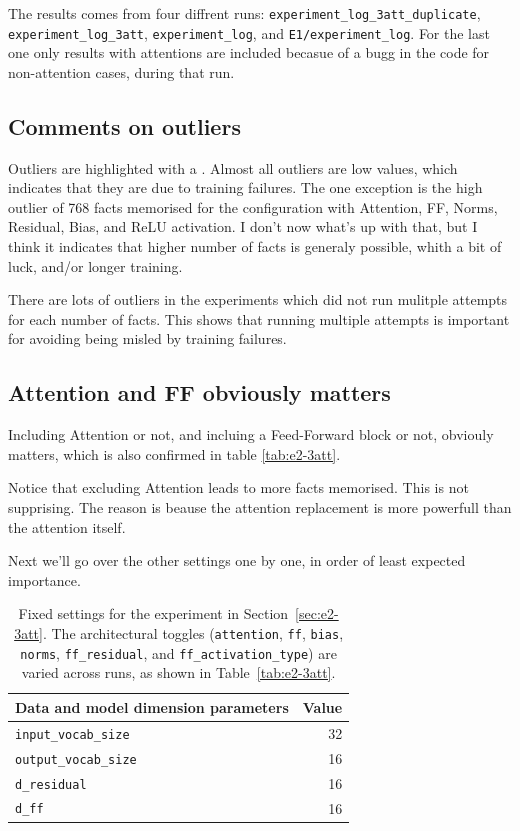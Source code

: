\documentclass[11pt,a4paper]{article}
\begin{document}
The results comes from four diffrent runs: \texttt{experiment\_log\_3att\_duplicate}, \texttt{experiment\_log\_3att}, \texttt{experiment\_log}, and \texttt{E1/experiment\_log}. For the last one only results with attentions are included becasue of a bugg in the code for non-attention cases, during that run. 

\subsection{Comments on outliers}
Outliers are highlighted with a . Almost all outliers are low values, which indicates that they are due to training failures. The one exception is the high outlier of 768 facts memorised for the configuration with Attention, FF, Norms, Residual, Bias, and ReLU activation. I don't now what's up with that, but I think it indicates that higher number of facts is generaly possible, whith a bit of luck, and/or longer training.

There are lots of outliers in the experiments which did not run mulitple attempts for each number of facts. This shows that running multiple attempts is important for avoiding being misled by training failures.

\subsection{Attention and FF obviously matters}
Including Attention or not, and incluing a Feed-Forward block or not, obviouly matters, which is also confirmed in table \ref{tab:e2-3att}. 

Notice that excluding Attention leads to more facts memorised. This is not supprising. The reason is beause the attention replacement is more powerfull than the attention itself. 

Next we'll go over the other settings one by one, in order of least expected importance.



\begin{table}[ht]
\centering
\begin{tabular}{@{}lr@{}}
\toprule
\textbf{Data and model dimension parameters} & \textbf{Value} \\
\midrule
\texttt{input\_vocab\_size}  & 32 \\
\texttt{output\_vocab\_size} & 16 \\
\texttt{d\_residual}         & 16 \\
\texttt{d\_ff}               & 16 \\
\bottomrule
\end{tabular}
\caption{Fixed settings for the experiment in Section~\ref{sec:e2-3att}. The architectural toggles (\texttt{attention}, \texttt{ff}, \texttt{bias}, \texttt{norms}, \texttt{ff\_residual}, and \texttt{ff\_activation\_type}) are varied across runs, as shown in Table~\ref{tab:e2-3att}.}
\label{tab:fixed-settings}
\end{table}
\end{document}

